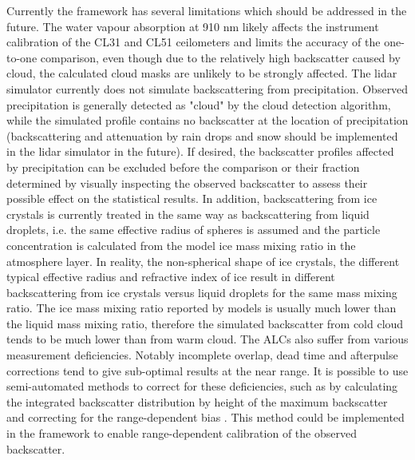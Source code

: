 Currently the framework has several limitations which should be addressed
in the future. The water vapour absorption at 910 nm likely affects
the instrument calibration of the CL31 and CL51 ceilometers and limits the accuracy of the one-to-one comparison,
even though due to the relatively high backscatter caused by cloud,
the calculated cloud masks are unlikely to be strongly affected. The lidar
simulator currently does not simulate backscattering from precipitation.
Observed precipitation is generally detected as "cloud" by the cloud
detection algorithm, while the simulated profile contains no backscatter
at the location of precipitation (backscattering and attenuation by rain drops
and snow should be implemented in the lidar simulator in the future).
If desired, the backscatter profiles affected
by precipitation can be excluded before the comparison or their fraction
determined by visually inspecting the observed backscatter to assess their
possible effect on the statistical results. In addition, backscattering from ice crystals
is currently treated in the same way as backscattering from liquid droplets,
i.e. the same effective radius of spheres is assumed and the particle concentration
is calculated from the model ice mass mixing ratio in the atmosphere layer.
In reality, the non-spherical shape of ice crystals, the different typical effective
radius and refractive index of ice result in different backscattering from ice crystals
versus liquid droplets for the same mass mixing ratio. The ice mass mixing ratio
reported by models is usually much lower than the liquid mass mixing ratio,
therefore the simulated backscatter from cold cloud tends to be
much lower than from warm cloud. The ALCs also suffer from various measurement
deficiencies. Notably incomplete overlap, dead time and afterpulse
corrections tend to give sub-optimal results at the near range. It is possible
to use semi-automated methods to correct for these deficiencies, such as
by calculating the integrated backscatter distribution by height of the maximum backscatter and correcting
for the range-dependent bias \citep[Sect. 5.1]{hopkin2019}. This method could be
implemented in the framework to enable range-dependent calibration of the
observed backscatter.

